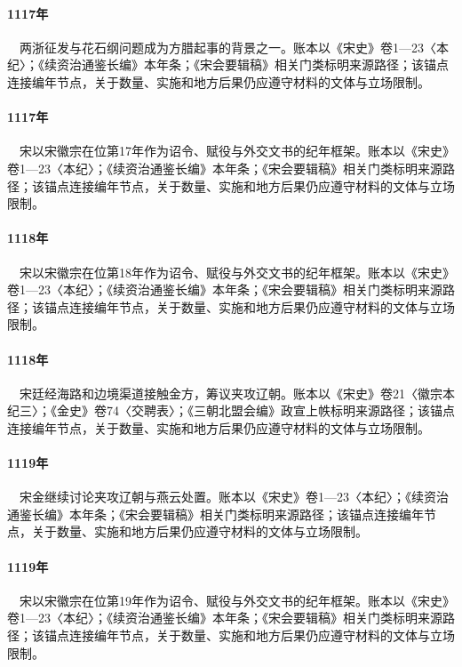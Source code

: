 \paragraph{1117年}　两浙征发与花石纲问题成为方腊起事的背景之一。账本以《宋史》卷1—23〈本纪〉；《续资治通鉴长编》本年条；《宋会要辑稿》相关门类标明来源路径；该锚点连接编年节点，关于数量、实施和地方后果仍应遵守材料的文体与立场限制。

\paragraph{1117年}　宋以宋徽宗在位第17年作为诏令、赋役与外交文书的纪年框架。账本以《宋史》卷1—23〈本纪〉；《续资治通鉴长编》本年条；《宋会要辑稿》相关门类标明来源路径；该锚点连接编年节点，关于数量、实施和地方后果仍应遵守材料的文体与立场限制。

\paragraph{1118年}　宋以宋徽宗在位第18年作为诏令、赋役与外交文书的纪年框架。账本以《宋史》卷1—23〈本纪〉；《续资治通鉴长编》本年条；《宋会要辑稿》相关门类标明来源路径；该锚点连接编年节点，关于数量、实施和地方后果仍应遵守材料的文体与立场限制。

\paragraph{1118年}　宋廷经海路和边境渠道接触金方，筹议夹攻辽朝。账本以《宋史》卷21〈徽宗本纪三〉；《金史》卷74〈交聘表〉；《三朝北盟会编》政宣上帙标明来源路径；该锚点连接编年节点，关于数量、实施和地方后果仍应遵守材料的文体与立场限制。

\paragraph{1119年}　宋金继续讨论夹攻辽朝与燕云处置。账本以《宋史》卷1—23〈本纪〉；《续资治通鉴长编》本年条；《宋会要辑稿》相关门类标明来源路径；该锚点连接编年节点，关于数量、实施和地方后果仍应遵守材料的文体与立场限制。

\paragraph{1119年}　宋以宋徽宗在位第19年作为诏令、赋役与外交文书的纪年框架。账本以《宋史》卷1—23〈本纪〉；《续资治通鉴长编》本年条；《宋会要辑稿》相关门类标明来源路径；该锚点连接编年节点，关于数量、实施和地方后果仍应遵守材料的文体与立场限制。

